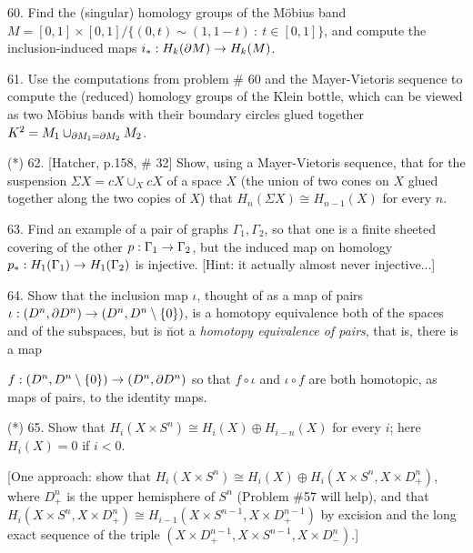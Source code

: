 \documentclass[12pt]{article}
\begin{document}
\begin{description}

\item{60.} Find the (singular) homology groups of the M\"obius band 
$M=[0,1]\times [0,1]/\{(0,t)\sim (1,1-t)\ :\ t\in [0,1]\}$, and compute
the inclusion-induced maps $i_*:H_k(\partial M)\rightarrow H_k(M)$.

\msk

\item{61.} Use the computations from problem \# 60 and the Mayer-Vietoris
sequence to compute the (reduced) homology groups of the Klein bottle, 
which can be viewed as two M\"obius bands with their boundary circles
glued together $K^2=M_1\cup_{\partial M_1 = \partial M_2} M_2$.

\msk

\item{(*)} 62. [Hatcher, p.158, \# 32] Show, using a Mayer-Vietoris sequence,
that for the suspension $\Sigma X = cX\cup_X cX$ of a space $X$ (the union of two cones
on $X$ glued together along the two copies of $X$) that $H_n(\Sigma X)\cong H_{n-1}(X)$
for every $n$.

\msk

\item{63.} Find an example of a pair of graphs $\Gamma_1,\Gamma_2$,
so that one is a finite sheeted covering of the other $p:\Gamma_1\rightarrow\Gamma_2$,
but the induced map on homology $p_*:H_1(\Gamma_1)\rightarrow H_1(\Gamma_2)$ is 
 injective. [Hint: it actually almost never 
injective...]

\msk

\item{64.} Show that the inclusion map $\iota$, thought of as a map of pairs 
$\iota:(D^n,\partial D^n)\rightarrow (D^n,D^n\setminus \{0\})$, is a homotopy
equivalence both of the spaces and of the subspaces, but is \u{not} a 
{\it homotopy equivalence of pairs}, that is, there is  a map 

\item{\spc} $f:(D^n,D^n\setminus \{0\})\rightarrow (D^n,\partial D^n)$ so that $f\circ \iota$ and $\iota\circ f$
are both homotopic, as maps of pairs, to the identity maps.

\msk

\item{(*)} 65. Show that $H_i(X\times S^n)\cong H_i(X)\oplus H_{i-n}(X)$ for every $i$;
here $H_i(X)=0$ if $i<0$.

\ssk

\item{\spc} [One approach: show that $H_i(X\times S^n)\cong H_i(X)\oplus H_i(X\times S^n,X\times D^n_+)$,
where $D^n_+$ is the upper hemisphere of $S^n$ 
(Problem \#57 will help), and that $H_i(X\times S^n,X\times D^n_+)\cong H_{i-1}(X\times S^{n-1},X\times D^{n-1}_+)$
by excision and the long exact sequence of the triple $(X\times D^{n-1}_+,X\times S^{n-1},X\times D^{n}_-)$.]


\end{description}
\end{document}
